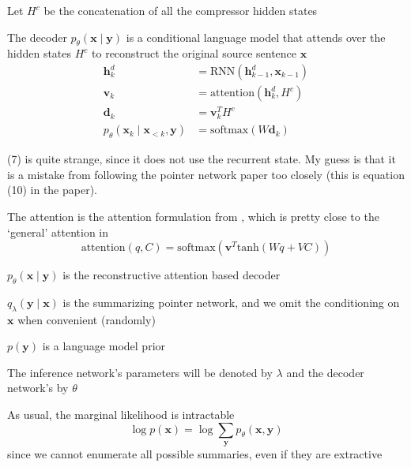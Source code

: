\documentclass{beamer}
\let\tempone\itemize
\let\temptwo\enditemize
\renewenvironment{itemize}{\tempone\addtolength{\itemsep}{0.5\baselineskip}}{\temptwo}
\newcommand{\bx}{\mathbf{x}}
\newcommand{\by}{\mathbf{y}}
\newcommand{\bh}{\mathbf{h}}
\newcommand{\bd}{\mathbf{d}}
\newcommand{\bv}{\mathbf{v}}
\begin{document}
\begin{frame}
\begin{center}
\end{center}
\begin{itemize}
\item Let $H^c$ be the concatenation of all the compressor hidden states
\item The decoder $p_\theta(\bx\mid\by)$
is a conditional language model that attends over the hidden states $H^c$ 
to reconstruct the original source sentence $\bx$
\begin{align}
\bh_k^d &= \textrm{RNN}(\bh_{k-1}^d, \bx_{k-1})\\
\bv_k &= \textrm{attention}(\bh_k^d, H^c)\\
\bd_k &= \bv_k^TH^c\\
p_\theta(\bx_k\mid\bx_{<k}, \by) &= \textrm{softmax}(W \bd_k)
\end{align}
\item (7) is quite strange, since it does not use the recurrent state.
My guess is that it is a mistake from following the pointer network
paper too closely (this is equation (10) in the paper).
\end{itemize}
\end{frame}

\begin{frame}
\begin{center}
\end{center}
\begin{itemize}
\item The attention is the attention formulation from \cite{Vinyals2015a},
which is pretty close to the `general' attention in \cite{Luong2015}
\begin{equation}
\textrm{attention}(q, C) = \textrm{softmax}(\bv^T\textrm{tanh}(Wq + VC))
\end{equation}
\item $p_\theta(\bx\mid\by)$ is the reconstructive attention based decoder
\item $q_\lambda(\by\mid\bx)$ is the summarizing pointer network,
and we omit the conditioning on $\bx$ when convenient (randomly)
\item $p(\by)$ is a language model prior
\end{itemize}
\end{frame}

\begin{frame}
\begin{center}
\end{center}
\begin{itemize}
\item The inference network's parameters will be denoted by $\lambda$
and the decoder network's by $\theta$
\item As usual, the marginal likelihood is intractable
\begin{equation}
\log p(\bx) = \log \sum_\by p_\theta(\bx, \by)
\end{equation}
since we cannot enumerate all possible summaries, even if they are extractive
\end{itemize}
\end{frame}
\end{document}
